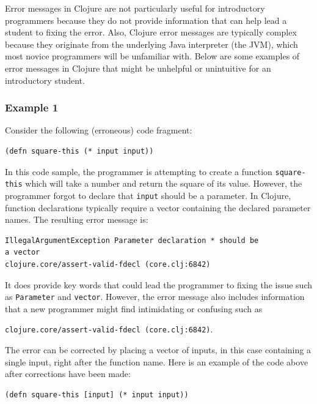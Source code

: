 \documentclass[12pt]{article}
\newcommand{\comment}[1]{{\bf \tt  {#1}}}
\newcommand{\emcomment}[1]{\textcolor{ForestGreen}{\comment{Elena: {#1}}}}
\begin{document}
Error messages in Clojure are not particularly useful for introductory programmers because they do not provide information that can help lead a student to fixing the error.
Also, Clojure error messages are typically complex because they originate from the underlying Java interpreter (the JVM), which most %
novice programmers will be unfamiliar with.
Below are some examples of error messages in Clojure that might be unhelpful or unintuitive for an introductory student.

\subsubsection{Example 1}\label{sec:ex1}

Consider the following (erroneous) code fragment:
\begin{verbatim}
(defn square-this (* input input))
\end{verbatim}

In this code sample, the programmer is attempting to create a function \texttt{square-this} which will take a number and return the square of its value.
However, the programmer forgot to declare that \texttt{input} should be a parameter.
In Clojure, function declarations typically require a vector containing the declared parameter names.
The resulting error message is: 
\begin{verbatim}
IllegalArgumentException Parameter declaration * should be 
a vector 
clojure.core/assert-valid-fdecl (core.clj:6842)
\end{verbatim}
It does provide key words that could lead the programmer to fixing the issue such as \texttt{Parameter} and \texttt{vector}.
However, the error message also includes information that a new programmer might find intimidating or confusing such as 

\noindent
\texttt{clojure.core/assert-valid-fdecl (core.clj:6842)}.



The error can be corrected by placing a vector of inputs, in this case containing a single input, right after the function name.
Here is an example of the code above after corrections have been made:
\begin{verbatim}
(defn square-this [input] (* input input))
\end{verbatim}
\end{document}
